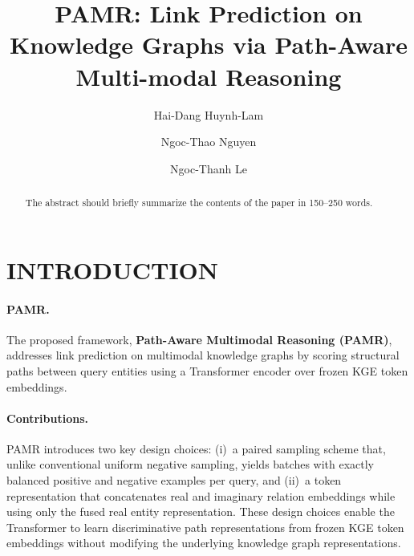 \documentclass[runningheads]{llncs}
\begin{document}
%
\title{PAMR: Link Prediction on Knowledge Graphs via Path-Aware Multi-modal Reasoning}
%
%
\author{Hai-Dang Huynh-Lam \and
  Ngoc-Thao Nguyen \and
Ngoc-Thanh Le}
%
%
%
\maketitle  %
%
\begin{abstract}
  The abstract should briefly summarize the contents of the paper in
  150--250 words.

\end{abstract}
%
%
%

\section{\uppercase{Introduction}}
\label{sec:introduction}


\paragraph{PAMR.}
The proposed framework, \textbf{Path-Aware Multimodal Reasoning (PAMR)}, addresses
link prediction on multimodal knowledge graphs by scoring structural paths between
query entities using a Transformer encoder over frozen KGE token embeddings.

\paragraph{Contributions.}
PAMR introduces two key design choices: (i)~a paired sampling scheme that, unlike
conventional uniform negative sampling, yields batches with exactly balanced positive
and negative examples per query, and (ii)~a token representation that concatenates
real and imaginary relation embeddings while using only the fused real entity
representation. These design choices enable the Transformer to learn discriminative
path representations from frozen KGE token embeddings without modifying the underlying
knowledge graph representations.
\end{document}
